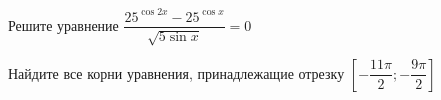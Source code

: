 \begin{ex}
	\begin{condition}
		\begin{enumcols}[label=\asbuk*)]
			\item Решите уравнение \( \dfrac{25^{\cos 2x} - 25^{\cos x}}{\sqrt{5\sin x}} = 0 \)
			\item Найдите все корни уравнения, принадлежащие отрезку \( \left[-\dfrac{11\pi}{2};-\dfrac{9\pi}{2}\right] \)
		\end{enumcols}
	\end{condition}
\end{ex}